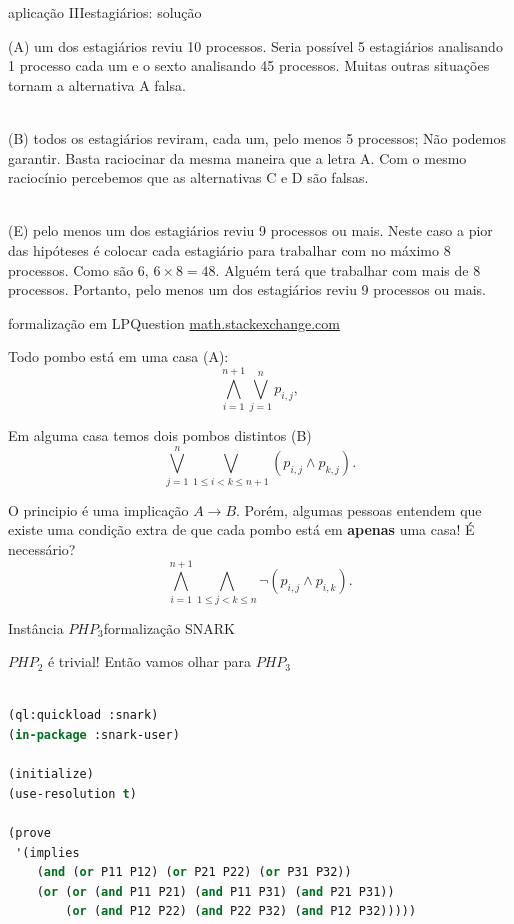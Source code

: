 \documentclass{beamer}
\begin{document}
\begin{frame}{aplicação III}{estagiários: solução}

  (A) um dos estagiários reviu 10 processos. Seria possível 5
  estagiários analisando 1 processo cada um e o sexto analisando 45
  processos. Muitas outras situações tornam a alternativa A falsa.\\~\

  (B) todos os estagiários reviram, cada um, pelo menos 5 processos;
  Não podemos garantir. Basta raciocinar da mesma maneira que a letra
  A.  Com o mesmo raciocínio percebemos que as alternativas C e D são
  falsas.\\~\

  (E) pelo menos um dos estagiários reviu 9 processos ou mais. Neste
  caso a pior das hipóteses é colocar cada estagiário para trabalhar
  com no máximo 8 processos. Como são 6, $6 \times 8 = 48$. Alguém
  terá que trabalhar com mais de 8 processos. Portanto, pelo menos um
  dos estagiários reviu 9 processos ou mais.
\end{frame}



\begin{frame}{formalização em LP}{Question \href{https://math.stackexchange.com/questions/1527273/pigeonhole-principle-formula-using-propositonal-logic}{math.stackexchange.com}}
  
Todo pombo está em uma casa (A):
$$
\bigwedge_{i=1}^{n+1}\bigvee_{j=1}^n p_{i,j},
$$

Em alguma casa temos dois pombos distintos (B)
$$
\bigvee_{j=1}^n\bigvee_{1\leq i<k\leq n+1}(p_{i,j}\land p_{k,j}).
$$

O principio é uma implicação $A \to B$. Porém, algumas pessoas
entendem que existe uma condição extra de que cada pombo está em
\textbf{apenas} uma casa! É necessário?
$$
\bigwedge_{i=1}^{n+1}\bigwedge_{1\leq j<k\leq n}\neg(p_{i,j}\land p_{i,k}).
$$
\end{frame}

\begin{frame}[fragile]{Instância $PHP_3$}{formalização SNARK}

  $PHP_2$ é trivial! Então vamos olhar para $PHP_3$ \\~\
  
\begin{lstlisting}[language=Lisp,basicstyle=\ttfamily\footnotesize]
(ql:quickload :snark)
(in-package :snark-user)

(initialize)
(use-resolution t)

(prove
 '(implies
    (and (or P11 P12) (or P21 P22) (or P31 P32))
    (or (or (and P11 P21) (and P11 P31) (and P21 P31))
        (or (and P12 P22) (and P22 P32) (and P12 P32)))))
\end{lstlisting}
\end{frame}
\end{document}

